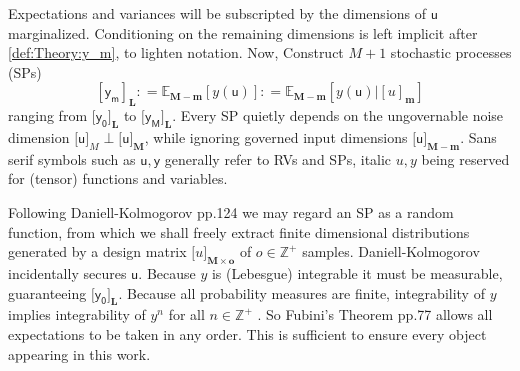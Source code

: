 \documentclass[preprint,12pt]{elsarticle}
\newcommand*{\M}[1]{\ensuremath{#1}\xspace}
\newcommand*{\x}{\times}
\newcommand*{\mi}[1]{\mathbf{#1}}
\newcommand*{\st}[1]{\mathbb{#1}}
\newcommand*{\rv}[1]{\mathsf{#1}}
\newcommand*{\te}[2][]{\left\lbrack{#2}\right\rbrack_{#1}}
\newcommand*{\tte}[2][]{\lbrack{#2}\rbrack_{#1}}
\newcommand*{\deq}{\M{\mathrel{\mathop:}=}}
\newcommand*{\ev}[3][]{\mathbb{E}_{#3}^{#1}\!\left\lbrack{#2}\right\rbrack}
\begin{document}
    Expectations and variances will be subscripted by the dimensions of $\rv{u}$ marginalized. Conditioning on the remaining dimensions is left implicit after \cref{def:Theory:y_m}, to lighten notation.
    Now, Construct $M+1$ stochastic processes (SPs)
    \begin{equation}\label{def:Theory:y_m}
        \te[\mi{L}]{\rv{y_m}} \deq \ev{y(\rv{u})}{\mi{M-m}} \deq \ev{y(\rv{u}) \big\vert \te[\mi{m}]{u}}{\mi{M-m}}
    \end{equation}
    ranging from $\tte[\mi{L}]{\rv{y_0}}$ to $\tte[\mi{L}]{\rv{y_M}}$. Every SP quietly depends on the ungovernable noise dimension $\tte[M]{\rv{u}} \perp \tte[\mi{M}]{\rv{u}}$, while ignoring governed input dimensions $\tte[\mi{M-m}]{\rv{u}}$. 
    Sans serif symbols such as $\rv{u,y}$ generally refer to RVs and SPs, italic $u,y$ being reserved for (tensor) functions and variables.
    
    Following Daniell-Kolmogorov \cite{Rogers.Williams2000} pp.124 we may regard an SP as a random function, from which we shall freely extract finite dimensional distributions generated by a design matrix $\tte[\mi{M\x o}]{u}$ of $o \in \st{Z}^{+}$ samples.
    Daniell-Kolmogorov incidentally secures $\rv{u}$. 
    Because $y$ is (Lebesgue) integrable it must be measurable, guaranteeing $\tte[\mi{L}]{\rv{y_0}}$.
    Because all probability measures are finite, integrability of $y$ implies integrability of $y^n$ for all $n \in \st{Z}^{+}$ \cite{Villani1985}. 
    So Fubini's Theorem \cite{Williams1991} pp.77 allows all expectations to be taken in any order. 
    This is sufficient to ensure every object appearing in this work.
\end{document}
